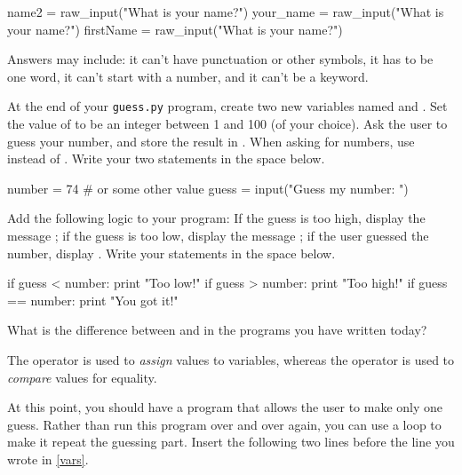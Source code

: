 \begin{pythlst}
    name2 = raw_input("What is your name?")
    your_name = raw_input("What is your name?")
    firstName = raw_input("What is your name?")
\end{pythlst}

\begin{answer}
Answers may include: it can't have punctuation or other symbols, it has to be one word, it can't start with a number, and it can't be a keyword.
\end{answer}


\Q \label{vars} At the end of your \texttt{guess.py} program, create two new variables named  and .
Set the value of  to be an integer between 1 and 100 (of your choice).
Ask the user to guess your number, and store the result in .
When asking for numbers, use  instead of .
Write your two statements in the space below.

\begin{answer}[3em]
\begin{pythans}
number = 74  # or some other value
guess = input("Guess my number: ")
\end{pythans}
\end{answer}


\Q Add the following logic to your program:
If the guess is too high, display the message ;
if the guess is too low, display the message ;
if the user guessed the number, display .
Write your statements in the space below.

\begin{answer}[8em]
\begin{pythans}
    if guess < number:
        print "Too low!"
    if guess > number:
        print "Too high!"
    if guess == number:
        print "You got it!"
\end{pythans}
\end{answer}


\Q What is the difference between \pyth{=} and \pyth{==} in the programs you have written today?

\begin{answer}[3em]
The \pyth{=} operator is used to \emph{assign} values to variables, whereas the \pyth{==} operator is used to \emph{compare} values for equality.
\end{answer}


\Q At this point, you should have a program that allows the user to make only one guess.
Rather than run this program over and over again, you can use a  loop to make it repeat the guessing part.
Insert the following two lines before the  line you wrote in \ref{vars}.

